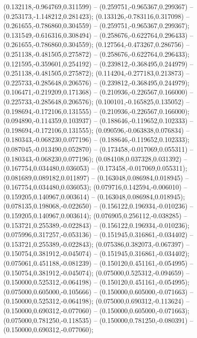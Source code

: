  (0.132118,-0.964769,0.311599) -- (0.259751,-0.965367,0.299367) -- (0.253173,-1.148212,0.281423);
 (0.133126,-0.783116,0.317098) -- (0.261655,-0.786860,0.304559) -- (0.259751,-0.965367,0.299367);
 (0.131549,-0.616316,0.308494) -- (0.258676,-0.622764,0.296433) -- (0.261655,-0.786860,0.304559);
 (0.127564,-0.473267,0.286756) -- (0.251138,-0.481505,0.275872) -- (0.258676,-0.622764,0.296433);
 (0.121595,-0.359601,0.254192) -- (0.239812,-0.368495,0.244979) -- (0.251138,-0.481505,0.275872);
 (0.114204,-0.277183,0.213873) -- (0.225733,-0.285648,0.206576) -- (0.239812,-0.368495,0.244979);
 (0.106471,-0.219209,0.171368) -- (0.210936,-0.226567,0.166000) -- (0.225733,-0.285648,0.206576);
 (0.100101,-0.165825,0.135052) -- (0.198694,-0.172106,0.131555) -- (0.210936,-0.226567,0.166000);
 (0.094890,-0.114359,0.103937) -- (0.188646,-0.119652,0.102333) -- (0.198694,-0.172106,0.131555);
 (0.090596,-0.063838,0.076834) -- (0.180343,-0.068230,0.077196) -- (0.188646,-0.119652,0.102333);
 (0.087045,-0.013490,0.052870) -- (0.173458,-0.017069,0.055311) -- (0.180343,-0.068230,0.077196);
 (0.084108,0.037328,0.031392) -- (0.167754,0.034480,0.036053) -- (0.173458,-0.017069,0.055311);
 (0.081689,0.089182,0.011897) -- (0.163048,0.086984,0.018945) -- (0.167754,0.034480,0.036053);
 (0.079716,0.142594,-0.006010) -- (0.159205,0.140967,0.003614) -- (0.163048,0.086984,0.018945);
 (0.078135,0.198068,-0.022650) -- (0.156122,0.196934,-0.010236) -- (0.159205,0.140967,0.003614);
 (0.076905,0.256112,-0.038285) -- (0.153721,0.255389,-0.022843) -- (0.156122,0.196934,-0.010236);
 (0.075996,0.317257,-0.053136) -- (0.151945,0.316861,-0.034402) -- (0.153721,0.255389,-0.022843);
 (0.075386,0.382073,-0.067397) -- (0.150754,0.381912,-0.045074) -- (0.151945,0.316861,-0.034402);
 (0.075061,0.451188,-0.081239) -- (0.150120,0.451161,-0.054995) -- (0.150754,0.381912,-0.045074);
 (0.075000,0.525312,-0.094659) -- (0.150000,0.525312,-0.064198) -- (0.150120,0.451161,-0.054995);
 (0.075000,0.605000,-0.105666) -- (0.150000,0.605000,-0.071663) -- (0.150000,0.525312,-0.064198);
 (0.075000,0.690312,-0.113624) -- (0.150000,0.690312,-0.077060) -- (0.150000,0.605000,-0.071663);
 (0.075000,0.781250,-0.118535) -- (0.150000,0.781250,-0.080391) -- (0.150000,0.690312,-0.077060);
